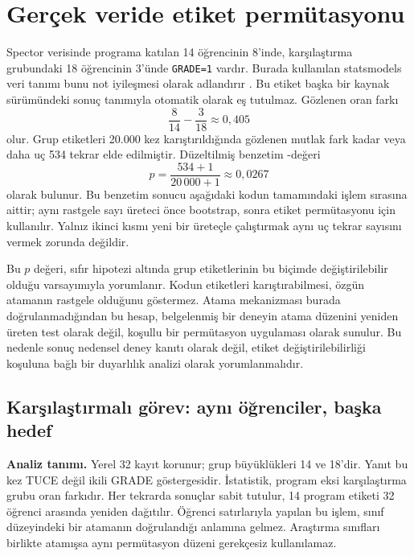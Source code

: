 \section{Gerçek veride etiket permütasyonu}

Spector verisinde programa katılan 14 öğrencinin 8'inde, karşılaştırma
grubundaki 18 öğrencinin 3'ünde \texttt{GRADE=1} vardır. Burada kullanılan
statsmodels veri tanımı bunu not iyileşmesi olarak adlandırır
\citep{statsmodelsSpector}. Bu etiket başka bir kaynak sürümündeki sonuç
tanımıyla otomatik olarak eş tutulmaz. Gözlenen oran farkı
\[
\frac{8}{14}-\frac{3}{18}\approx0{,}405
\]
olur. Grup etiketleri 20.000 kez karıştırıldığında gözlenen mutlak fark kadar
veya daha uç 534 tekrar elde edilmiştir. Düzeltilmiş benzetim \pval-değeri
\[
p=\frac{534+1}{20\,000+1}\approx0{,}0267
\]
olarak bulunur. Bu benzetim sonucu aşağıdaki kodun tamamındaki işlem
sırasına aittir; aynı rastgele sayı üreteci önce bootstrap, sonra etiket
permütasyonu için kullanılır. Yalnız ikinci kısmı yeni bir üreteçle
çalıştırmak aynı uç tekrar sayısını vermek zorunda değildir.

Bu $p$ değeri, sıfır hipotezi altında grup etiketlerinin bu biçimde
değiştirilebilir olduğu varsayımıyla yorumlanır. Kodun etiketleri
karıştırabilmesi, özgün atamanın rastgele olduğunu göstermez. Atama
mekanizması burada doğrulanmadığından bu hesap, belgelenmiş bir deneyin
atama düzenini yeniden üreten test olarak değil, koşullu bir permütasyon
uygulaması olarak sunulur. Bu nedenle sonuç nedensel deney kanıtı olarak
değil, etiket değiştirilebilirliği koşuluna bağlı bir duyarlılık analizi
olarak yorumlanmalıdır.

\subsection{Karşılaştırmalı görev: aynı öğrenciler, başka hedef}

\textbf{Analiz tanımı.} Yerel 32 kayıt korunur; grup büyüklükleri 14 ve
18'dir. Yanıt bu kez TUCE değil ikili GRADE göstergesidir. İstatistik,
program eksi karşılaştırma grubu oran farkıdır. Her tekrarda sonuçlar sabit
tutulur, 14 program etiketi 32 öğrenci arasında yeniden dağıtılır. Öğrenci
satırlarıyla yapılan bu işlem, sınıf düzeyindeki bir atamanın doğrulandığı
anlamına gelmez. Araştırma sınıfları birlikte atamışsa aynı permütasyon
düzeni gerekçesiz kullanılamaz.

